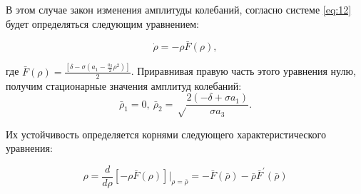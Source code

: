 В этом случае закон изменения амплитуды колебаний, согласно системе \eqref{eq:12}  будет определяться следующим уравнением: 

\begin{equation}
\label{eq:19}
\dot\rho=-\rho \bar{F}(\rho),
\end{equation}

\noindent где $\bar{F}(\rho)=\frac{[\delta-\sigma(a_1-\frac{a_3}{2}\rho^2)]}{2}$. Приравнивая правую часть этого уравнения нулю, получим стационарные значения амплитуд колебаний:
\begin{equation}
\label{eq:20}
\bar{\rho}_1=0,~ \bar{\rho}_2=\sqrt\frac{2(-\delta+\sigma a_1)}{\sigma a_3}.
\end{equation}

Их устойчивость определяется корнями следующего характеристического уравнения:

\begin{equation}
\label{eq:21}
\rho=\frac{d}{d\rho}[-\rho\bar{F}(\rho)]\bigg|_{\rho=\bar{\rho}}=-\bar{F}(\bar{\rho})-\bar{\rho}\bar{F}^{'}(\bar{\rho})
\end{equation}

